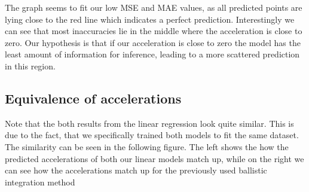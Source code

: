The graph seems to fit our low MSE and MAE values, as all predicted points are lying close to the red line which indicates
a perfect prediction.
Interestingly we can see that most inaccuracies lie in the middle where the acceleration is close to zero.
Our hypothesis is that if our acceleration is close to zero the model has the least amount of information for inference, leading
to a more scattered prediction in this region.

\subsection{Equivalence of accelerations}

Note that the both results from the linear regression look quite similar. 
This is due to the fact, that we specifically trained both models to fit the same dataset. 
The similarity can be seen in the following figure.
The left shows the how the predicted accelerations of both our linear models match up, while on the right we can see how the 
accelerations match up for the previously used ballistic integration method


